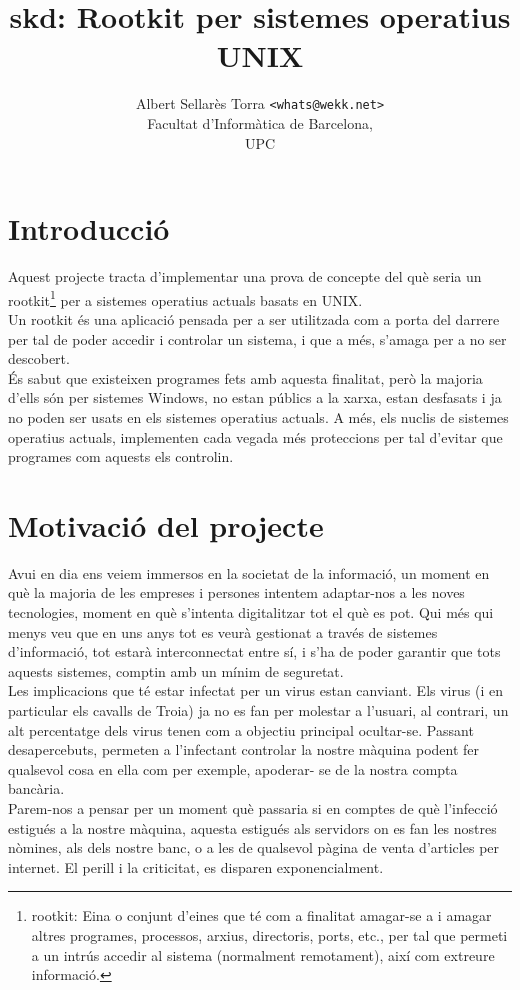 \documentclass[a4paper]{article}
\author{Albert Sellarès Torra \texttt{<whats@wekk.net>}\\
        Facultat d'Informàtica de Barcelona,\\
        UPC\\}
\title{skd: Rootkit per sistemes operatius UNIX}
\begin{document}
\maketitle
\newpage


\section{Introducció}

Aquest projecte tracta d'implementar una prova de concepte del què seria un rootkit\footnote{rootkit:
Eina o conjunt d'eines que té com a finalitat amagar-se a i amagar altres programes, processos, arxius, 
directoris, ports, etc., per tal que permeti a un intrús accedir al sistema (normalment remotament), 
així com extreure informació.} per a sistemes operatius actuals basats en UNIX.\\ 
Un rootkit és una aplicació pensada per a ser utilitzada com a porta del darrere per tal de
poder accedir i controlar un sistema, i que a més, s'amaga per a no ser descobert.\\
És sabut que existeixen programes fets amb aquesta finalitat, però la majoria d'ells són
per sistemes Windows, no estan públics a la xarxa, estan desfasats i ja no poden ser
usats en els sistemes operatius actuals. A més, els nuclis de sistemes operatius actuals, implementen cada vegada més
proteccions per tal d'evitar que programes com aquests els controlin.

\section{Motivació del projecte}

Avui en dia ens veiem immersos en la societat de la informació, un moment en què la
majoria de les empreses i persones intentem adaptar-nos a les noves tecnologies,
moment en què s'intenta digitalitzar tot el què es pot. Qui més qui menys veu que en uns anys tot es veurà gestionat a través de sistemes
d'informació, tot estarà interconnectat entre sí, i s'ha de poder garantir que tots aquests
sistemes, comptin amb un mínim de seguretat.\\


Les implicacions que té estar infectat per un virus estan canviant. Els virus (i en particular
els cavalls de Troia) ja no es fan per molestar a l'usuari, al contrari, un alt percentatge dels
virus tenen com a objectiu principal ocultar-se. Passant desapercebuts, permeten a l'infectant
controlar la nostre màquina podent fer qualsevol cosa en ella com per exemple, apoderar-
se de la nostra compta bancària.\\
Parem-nos a pensar per un moment què passaria si en comptes de què l'infecció estigués
a la nostre màquina, aquesta estigués als servidors on es fan les nostres nòmines, als dels
nostre banc, o a les de qualsevol pàgina de venta d'articles per internet. El perill i la
criticitat, es disparen exponencialment.\\
\end{document}
